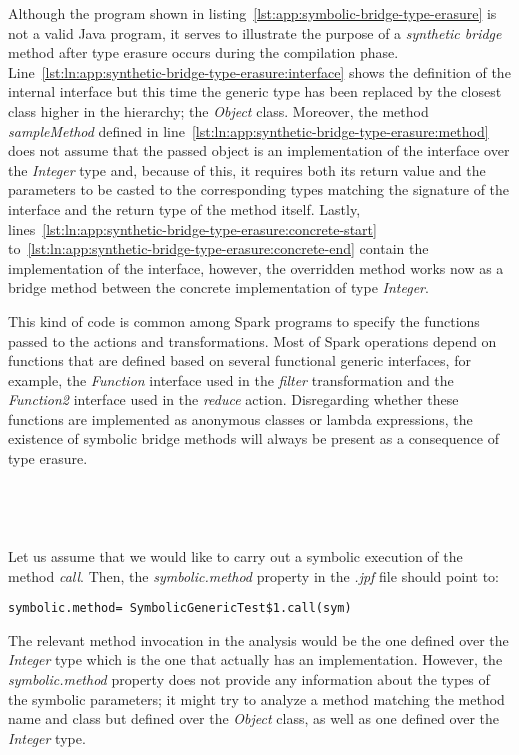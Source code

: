 Although the program shown in listing~\ref{lst:app:symbolic-bridge-type-erasure} is not a valid Java program, it serves to illustrate the purpose of a \textit{synthetic bridge} method after type erasure occurs during the compilation phase. Line~\ref{lst:ln:app:synthetic-bridge-type-erasure:interface} shows the definition of the internal interface but this time the generic type has been replaced by the closest class higher in the hierarchy; the \textit{Object} class. Moreover, the method \textit{sampleMethod} defined in line~\ref{lst:ln:app:synthetic-bridge-type-erasure:method} does not assume that the passed object is an implementation of the interface over the \textit{Integer} type and, because of this, it requires both its return value and the parameters to be casted to the corresponding types matching the signature of the interface and the return type of the method itself. Lastly, lines~\ref{lst:ln:app:synthetic-bridge-type-erasure:concrete-start} to~\ref{lst:ln:app:synthetic-bridge-type-erasure:concrete-end} contain the implementation of the interface, however, the overridden method works now as a bridge method between the concrete implementation of type \textit{Integer}. 

This kind of code is common among Spark programs to specify the functions passed to the actions and transformations. Most of Spark operations depend on functions that are defined based on several functional generic interfaces, for example, the \textit{Function} interface used in the \textit{filter} transformation and the \textit{Function2} interface used in the \textit{reduce} action. Disregarding whether these functions are implemented as anonymous classes or lambda expressions, the existence of symbolic bridge methods will always be present as a consequence of type erasure.
\\ \\ \\ \\ \\
Let us assume that we would like \spf{} to carry out a symbolic execution of the method \textit{call}. Then, the \textit{symbolic.method} property in the \textit{.jpf} file should point to:

\hspace*{1cm} \texttt{symbolic.method= SymbolicGenericTest\$1.call(sym)}

The relevant method invocation in the analysis would be the one defined over the \textit{Integer} type which is the one that actually has an implementation. However, the \textit{symbolic.method} property does not provide any information about the types of the symbolic parameters; it might try to analyze a method matching the method name and class but defined over the \textit{Object} class, as well as one defined over the \textit{Integer} type.


